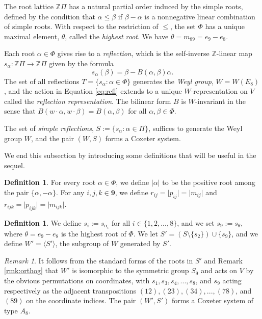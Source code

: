 \documentclass[11pt]{amsart}
\theoremstyle{plain}
\theoremstyle{definition}
\newtheorem{defn}[theorem]{Definition}
\theoremstyle{remark}
\newtheorem{rmk}[theorem]{Remark}
\numberwithin{equation}{section}
\newcommand{\al}{\alpha}
\newcommand{\be}{\beta}
\newcommand{\Z}{{\mathbb Z}}
\newcommand{\ra}{\rightarrow}
\newcommand{\simproots}{\Pi}
\newcommand{\allroots}{\Phi}
\newcommand{\mr}{m}
\newcommand{\nine}{\mathbf{9}}
\newcommand{\ip}[1]{\langle#1\rangle}
\newcommand{\abs}[1]{\lvert #1 \rvert}
\begin{document}
The root lattice $\Z\Pi$ has a natural partial order induced by the simple
roots, defined by the condition that $\al \leq \be$ if $\be - \al$ is a
nonnegative linear combination of simple roots. With respect to the restriction
of $\le$, the set $\Phi$ has a unique maximal element, $\theta$, called the
\emph{highest root}. We have $\theta=\mr_{89} =  e_9 - e_8$.

Each root $\al \in \allroots$ gives rise to a \emph{reflection}, which is the
self-inverse $\Z$-linear map $s_\alpha: \Z\Pi\ra \Z\Pi$ given by the formula
\begin{equation} \label{eq:refl} s_\al(\be) = \be - B(\al, \be)\al.
\end{equation} The set of all reflections $T=\{s_\al: \al\in \Phi\}$ generates
the \emph{Weyl group}, $W=W(E_8)$, and the action in Equation \eqref{eq:refl}
extends to a unique $W$-representation on $V$ called the \emph{reflection
representation}. The bilinear form $B$ is $W$-invariant in the sense that
$B(w\cdot \al,w\cdot \be)=B(\al,\be)$ for all $\al,\be\in \Phi$. 

The set of \emph{simple reflections}, $S := \{s_\al : \al \in \simproots\}$,
suffices to generate the Weyl group $W$, and the pair $(W,S)$ forms a Coxeter
system. 

We end this subsection by introducing some definitions that will be useful in
the sequel. 

\begin{defn}
\label{defn:abs}
For every root $\al\in \Phi$, we define $\abs{\al}$ to be the positive root
among the pair $\{\al,-\al\}$. For any $i,j,k\in \nine$, we define 
$r_{ij}=\abs{p_{ij}}=\abs{m_{ij}}$ and $r_{ijk}=\abs{p_{ijk}}=\abs{m_{ijk}}$.
\end{defn}
 

\begin{defn}
\label{defn:S9}
We define $s_{i}:=s_{\al_i}$ for all $i\in \{1,2,...,8\}$, and we set
$s_9:=s_\theta$, where $\theta=e_9-e_8$ is the highest root of $\Phi$. We let
$S'=(S\setminus\{s_2\})\cup\{s_9\}$, and we define $W'=\ip{S'}$, the subgroup of
$W$ generated by $S'$.
\end{defn}

\begin{rmk}
\label{rmk:S9}
It follows from the standard forms of the roots in $S'$ and Remark
\ref{rmk:orthog} that $W'$ is isomorphic to the symmetric group $S_9$ and acts
on $V$ by the obvious permutations on coordinates, with $s_1,s_3,s_4,...,s_8$,
and $s_9$ acting respectively as the adjacent transpositions
$(12),(23),(34),..., (78)$, and $(89)$ on the coordinate indices. The pair
$(W',S')$ forms a Coxeter system of type $A_8$. \end{rmk}
\end{document}

